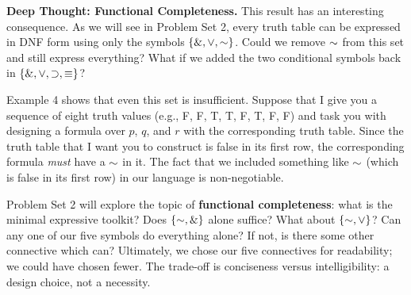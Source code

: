 \documentclass[options]{philosophersimprint}
\begin{document}
\begin{framed}
\noindent\textbf{Deep Thought: Functional Completeness.} This result has an interesting consequence. As we will see in Problem Set 2, every truth table can be expressed in DNF form using only the symbols $\{\mathbin{\&},\mathbin{\vee},\mathord{\sim}\}$. Could we remove $\mathord{\sim}$ from this set and still express everything? What if we added the two conditional symbols back in $\{\mathbin{\&},\mathbin{\vee},\mathbin{\supset},\mathbin{\equiv}\}$?

Example 4 shows that even this set is insufficient. Suppose that I give you a sequence of eight truth values (e.g., F, F, T, T, F, T, F, F) and task you with designing a formula over $p$, $q$, and $r$ with the corresponding truth table. Since the truth table that I want you to construct is false in its first row, the corresponding formula \textit{must} have a $\mathord{\sim}$ in it. The fact that we included something like $\mathord{\sim}$ (which is false in its first row) in our language is non-negotiable.

Problem Set 2 will explore the topic of \textbf{functional completeness}: what is the minimal expressive toolkit? Does $\{\mathord{\sim}, \mathbin{\&}\}$ alone suffice? What about $\{\mathord{\sim}, \mathbin{\vee}\}$? Can any one of our five symbols do everything alone? If not, is there some other connective which can? Ultimately, we chose our five connectives for readability; we could have chosen fewer. The trade-off is conciseness versus intelligibility: a design choice, not a necessity.
\end{framed}


\end{document}
